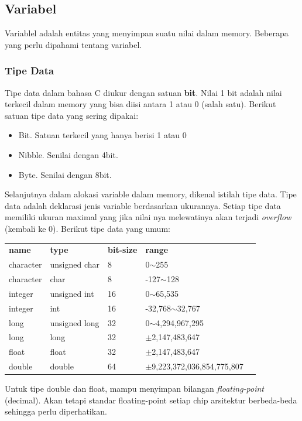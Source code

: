 \documentclass[12pt,]{article}
\begin{document}
	\newpage
	\subsection{Variabel}
	Variablel adalah entitas yang menyimpan suatu nilai dalam memory.
	Beberapa yang perlu dipahami tentang variabel.

	\subsubsection{Tipe Data}
	Tipe data dalam bahasa C diukur dengan satuan \textbf{bit}.
	Nilai 1 bit adalah nilai terkecil dalam memory yang bisa diisi antara 1 atau 0 (salah satu).
	Berikut satuan tipe data yang sering dipakai:
	\begin{itemize}
		\item Bit. Satuan terkecil yang hanya berisi 1 atau 0
		\item Nibble. Senilai dengan 4bit.
		\item Byte. Senilai dengan 8bit.
	\end{itemize}

	Selanjutnya dalam alokasi variable dalam memory, dikenal istilah tipe data.
	Tipe data adalah deklarasi jenis variable berdasarkan ukurannya.
	Setiap tipe data memiliki ukuran maximal yang jika nilai nya melewatinya akan terjadi \textit{overflow} (kembali ke 0).
	Berikut tipe data yang umum:
	\begin{table}[H]
		\begin{tabular}{|l|l|l|l|l}
			\cline{1-4}
			\textbf{name}      & \textbf{type}          & \textbf{bit-size} & \textbf{range} &  \\ \cline{1-4}
			character & unsigned char & 8  & 0$\sim$255           &  \\ \cline{1-4}
			character & char          & 8  & -127$\sim$128        &  \\ \cline{1-4}
			integer   & unsigned int  & 16 & 0$\sim$65,535        &  \\ \cline{1-4}
			integer   & int  		  & 16 & -32,768$\sim$32,767  &  \\ \cline{1-4}
			long	  & unsigned long & 32 & 0$\sim$4,294,967,295 &  \\ \cline{1-4}
			long	  & long 		  & 32 & $\pm$2,147,483,647	  &  \\ \cline{1-4}
			float	  & float 		  & 32 & $\pm$2,147,483,647	  &  \\ \cline{1-4}
			double	  & double 		  & 64 & $\pm$9,223,372,036,854,775,807	&  \\ \cline{1-4}
		\end{tabular}
	\end{table}
	Untuk tipe double dan float, mampu menyimpan bilangan \textit{floating-point} (decimal).
	Akan tetapi standar floating-point setiap chip arsitektur berbeda-beda sehingga perlu diperhatikan.
\end{document}
